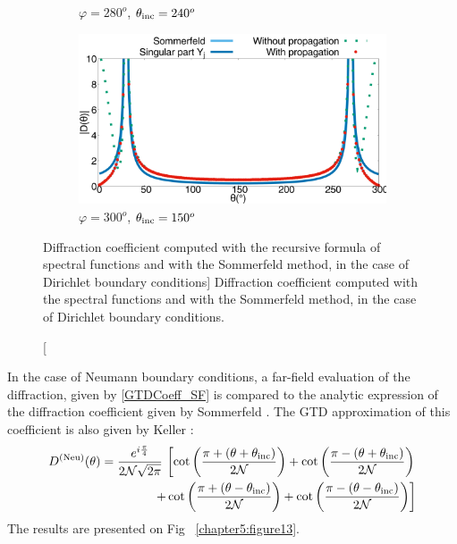 \begin{figure}[h!]
\begin{subfigure}[b]{0.49\textwidth}
        \caption{$\varphi = 280^o$, $\theta_{\rm inc} = 240^o$}
        \label{chapter5:figure12d}
    \end{subfigure}
\begin{subfigure}[b]{0.49\textwidth}
        \includegraphics[width=\textwidth]{images/chapter2/Figure8d.pdf}
        \caption{$\varphi = 300^o$, $\theta_{\rm inc} = 150^o$}
        \label{chapter5:figure12c}
    \end{subfigure}
\caption
[Diffraction coefficient computed with the recursive formula of spectral functions and with the Sommerfeld method, in the case of Dirichlet boundary conditions]
{Diffraction  coefficient computed with the spectral functions and with the Sommerfeld method, in the case of Dirichlet boundary conditions.}
\label{chapter5:figure12}
\end{figure}

In the case of Neumann boundary conditions, a far-field evaluation of the diffraction, given by \eqref{GTDCoeff_SF} is compared to the analytic expression of the diffraction coefficient given by Sommerfeld \cite{Sommerfeld}. The GTD approximation of this coefficient is also given by Keller \cite{GTD} :
\begin{align}
\label{GTDCoeff_Neu}
D^{\rm (Neu)}(\theta) = \dfrac{e^{i\frac{\pi}{4}}}{2\mathcal{N} \sqrt{2\pi}}  \, \left[ \cot \left( \dfrac{\pi + (\theta + \theta_{\rm inc})}{2\mathcal{N}} \right) + \cot \left( \dfrac{\pi - (\theta + \theta_{\rm inc})}{2\mathcal{N}} \right) \right.   \nonumber \\
\left. + \cot \left( \dfrac{\pi + (\theta - \theta_{\rm inc})}{2\mathcal{N}} \right) + \cot \left( \dfrac{\pi - (\theta - \theta_{\rm inc})}{2\mathcal{N}} \right) \right] 
\end{align}
The results are presented on Fig ~\ref{chapter5:figure13}.

